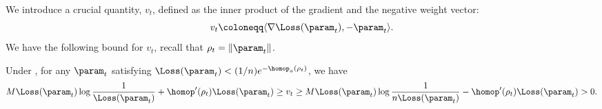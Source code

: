 We introduce a crucial quantity, $v_t$, defined as the inner product of the gradient and the negative weight vector: 
\begin{equation}
\label{eq: vt}
    v_t \coloneqq  \langle \nabla \Loss(\param_t), - \param_t \rangle.  
\end{equation}
We have the following bound for $v_t$, recall that $\rho_t = \| \param_t \|$.


\begin{lemma}
[Bound of $v_t$]
\label{lem: Bound of v_t} Under , for any $\param_t$ satisfying $\Loss (\param_t) < (1/n) e^{-\homop_a(\rho_t)}$, we have 
\[
   M \Loss (\param_t) \log \frac{1}{\Loss (\param_t)} + \homop'(\rho_t) \Loss (\param_t) \ge  v_t \ge M \Loss (\param_t) \log \frac{1}{n\Loss (\param_t)} - \homop^{\prime}(\rho_t)\Loss (\param_t)>0.
\]
\end{lemma}

